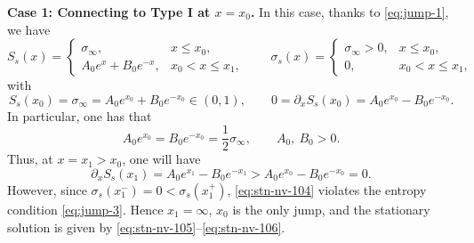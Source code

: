 \documentclass[12pt]{article}
\theoremstyle{definition}
\theoremstyle{remark}
\newcommand{\dx}{\partial_x}
\numberwithin{equation}{section}
\begin{document}
{\noindent\bf Case 1: Connecting to Type I at $ x = x_0 $.}
In this case, thanks to \eqref{eq:jump-1}, we have
\begin{equation}
    \label{eq:stn-nv-101}
    S_s(x) = \begin{cases}
        \sigma_{\infty}, & x \leq x_0, \\
        A_0 e^x + B_0 e^{-x}, & x_0 < x \leq x_1, 
    \end{cases} \qquad \sigma_s(x) = \begin{cases}
        \sigma_{\infty} > 0, & x \leq x_0, \\
        0, & x_0 < x \leq x_1, 
    \end{cases}
\end{equation}
with 
\begin{equation}
    \label{eq:stn-nv-102}
    S_s(x_0) = \sigma_\infty = A_0 e^{x_0} + B_0 e^{-x_0} \in (0,1), \qquad 0 = \dx S_s(x_0) = A_0 e^{x_0} - B_0 e^{-x_0}. 
\end{equation}
In particular, one has that 
\begin{equation}
    \label{eq:stn-nv-103}
    A_0 e^{x_0} = B_0 e^{-x_0} = \frac{1}{2} \sigma_\infty, \qquad A_0, \ B_0 > 0.  
\end{equation}
Thus, at $ x = x_1 > x_0 $, one will have
\begin{equation}
    \label{eq:stn-nv-104}
    \dx S_s(x_1) = A_0 e^{x_1} - B_0 e^{-x_1} >  A_0 e^{x_0} - B_0 e^{-x_0} = 0. 
\end{equation}
However, since $ \sigma_s(x_1^-) = 0 < \sigma_s(x_1^+) $, \eqref{eq:stn-nv-104} violates the entropy condition \eqref{eq:jump-3}. Hence $ x_1 = \infty $, $ x_0 $ is the only jump, and the stationary solution is given by \eqref{eq:stn-nv-105}--\eqref{eq:stn-nv-106}.
\end{document}
